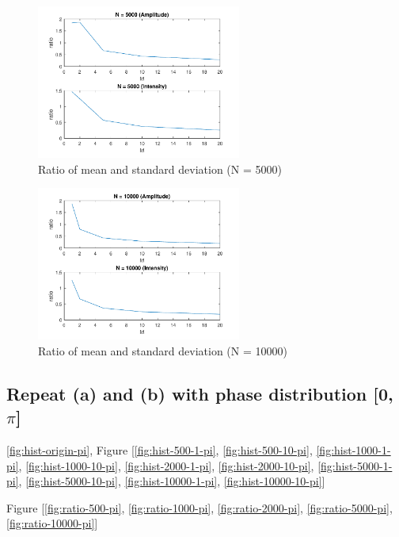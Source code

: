 \documentclass{article}
\begin{document}
\begin{figure}[H]
	\centering
	\includegraphics[width = 0.6\textwidth]{src/2pi/ratio_5000.pdf}
	\caption{Ratio of mean and standard deviation (N = 5000)}
	\label{fig:ratio-5000}
\end{figure}
\begin{figure}[H]
	\centering
	\includegraphics[width = 0.6\textwidth]{src/2pi/ratio_10000.pdf}
	\caption{Ratio of mean and standard deviation (N = 10000)}
	\label{fig:ratio-10000}
\end{figure}

\subsection{Repeat (a) and (b) with phase distribution [0, $\pi$]}
\ref{fig:hist-origin-pi}, 
Figure [\ref{fig:hist-500-1-pi}, \ref{fig:hist-500-10-pi}, \ref{fig:hist-1000-1-pi}, \ref{fig:hist-1000-10-pi}, \ref{fig:hist-2000-1-pi}, 
\ref{fig:hist-2000-10-pi}, \ref{fig:hist-5000-1-pi}, \ref{fig:hist-5000-10-pi}, \ref{fig:hist-10000-1-pi}, \ref{fig:hist-10000-10-pi}]

Figure
[\ref{fig:ratio-500-pi}, \ref{fig:ratio-1000-pi}, \ref{fig:ratio-2000-pi}, \ref{fig:ratio-5000-pi}, \ref{fig:ratio-10000-pi}]
\end{document}
